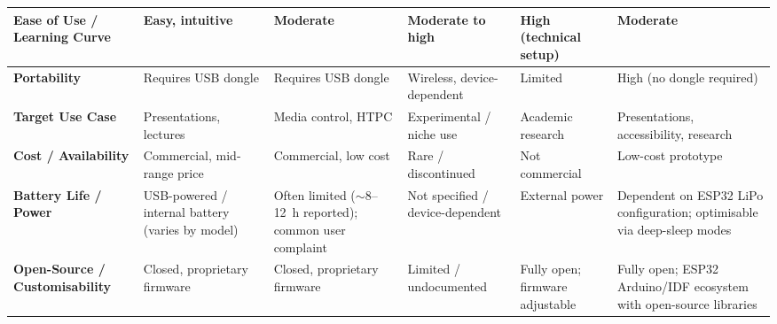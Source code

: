 \begin{longtable}{|p{2.9cm}|p{2.35cm}|p{2.35cm}|p{2.35cm}|p{2.35cm}|p{2.35cm}|}
\textbf{Ease of Use / Learning Curve} &
Easy, intuitive &
Moderate &
Moderate to high &
High (technical setup) &
Moderate \\
\hline

\textbf{Portability} &
Requires USB dongle &
Requires USB dongle &
Wireless, device-dependent &
Limited &
High (no dongle required) \\
\hline

\textbf{Target Use Case} &
Presentations, lectures &
Media control, HTPC &
Experimental / niche use &
Academic research &
Presentations, accessibility, research \\
\hline

\textbf{Cost / Availability} &
Commercial, mid-range price &
Commercial, low cost &
Rare / discontinued &
Not commercial &
Low-cost prototype \\
\hline

\textbf{Battery Life / Power} &
USB-powered / internal battery (varies by model) &
Often limited ($\sim$8--12~h reported); common user complaint &
Not specified / device-dependent &
External power &
Dependent on ESP32 LiPo configuration; optimisable via deep-sleep modes \\
\hline

\textbf{Open-Source / Customisability} &
Closed, proprietary firmware &
Closed, proprietary firmware &
Limited / undocumented &
Fully open; firmware adjustable &
Fully open; ESP32 Arduino/IDF ecosystem with open-source libraries \\
\hline

\end{longtable}